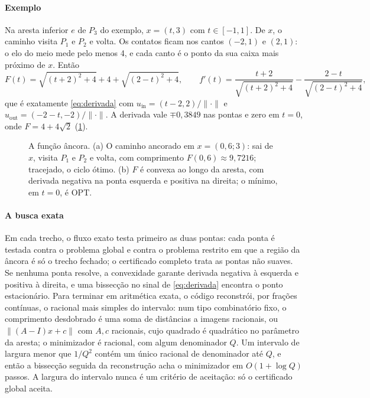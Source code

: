 \documentclass[11pt,a4paper]{article}
\theoremstyle{plain}\newtheorem{proposicao}{Proposição}
\theoremstyle{definition}\newtheorem{definicao}{Definição}
\theoremstyle{plain}\newtheorem{teorema}{Teorema}
\theoremstyle{plain}\newtheorem{lema}{Lema}
\newcommand{\norm}[1]{\lVert#1\rVert}
\newcommand{\OPT}{\mathrm{OPT}}
\begin{document}
\paragraph{Exemplo} Na aresta inferior \(e\) de \(P_3\) do exemplo, \(x=(t,3)\) com \(t\in[-1,1]\). De \(x\), o caminho visita \(P_1\) e \(P_2\) e volta. Os contatos ficam nos cantos \((-2,1)\) e \((2,1)\): o elo do meio mede pelo menos 4, e cada canto é o ponto da sua caixa mais próximo de \(x\). Então
\[
F(t)=\sqrt{(t+2)^2+4}+4+\sqrt{(2-t)^2+4},\qquad
f'(t)=\frac{t+2}{\sqrt{(t+2)^2+4}}-\frac{2-t}{\sqrt{(2-t)^2+4}},
\]
que é exatamente \eqref{eq:derivada} com \(u_{\text{in}}=(t-2,2)/\norm{\cdot}\) e \(u_{\text{out}}=(-2-t,-2)/\norm{\cdot}\). A derivada vale \(\mp0{,}3849\) nas pontas e zero em \(t=0\), onde \(F=4+4\sqrt2\) (\cref{fig:ancora}).

\begin{figure}[ht]\centering\figancora
\caption{A função âncora. (a) O caminho ancorado em \(x=(0{,}6;3)\): sai de \(x\), visita \(P_1\) e \(P_2\) e volta, com comprimento \(F(0{,}6)\approx9{,}7216\); tracejado, o ciclo ótimo. (b) \(F\) é convexa ao longo da aresta, com derivada negativa na ponta esquerda e positiva na direita; o mínimo, em \(t=0\), é \(\OPT\).}\label{fig:ancora}
\end{figure}

\paragraph{A busca exata} Em cada trecho, o fluxo exato testa primeiro as duas pontas: cada ponta é testada contra o problema global e contra o problema restrito em que a região da âncora é só o trecho fechado; o certificado completo trata as pontas não suaves. Se nenhuma ponta resolve, a convexidade garante derivada negativa à esquerda e positiva à direita, e uma bissecção no sinal de \eqref{eq:derivada} encontra o ponto estacionário. Para terminar em aritmética exata, o código reconstrói, por frações contínuas, o racional mais simples do intervalo: num tipo combinatório fixo, o comprimento desdobrado é uma soma de distâncias a imagens racionais, ou \(\norm{(A-I)x+c}\) com \(A,c\) racionais, cujo quadrado é quadrático no parâmetro da aresta; o minimizador é racional, com algum denominador \(Q\). Um intervalo de largura menor que \(1/Q^2\) contém um único racional de denominador até \(Q\), e então a bissecção seguida da reconstrução acha o minimizador em \(O(1+\log Q)\) passos. A largura do intervalo nunca é um critério de aceitação: só o certificado global aceita.
\end{document}
